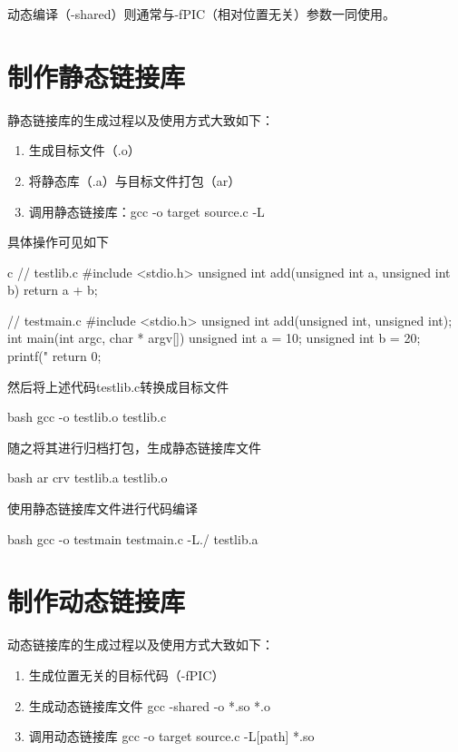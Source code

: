 动态编译（-shared）则通常与-fPIC（相对位置无关）参数一同使用。

\section{制作静态链接库}
静态链接库的生成过程以及使用方式大致如下：
\begin{enumerate}
  \item 生成目标文件（.o）
  \item 将静态库（.a）与目标文件打包（ar）
  \item 调用静态链接库：gcc -o target source.c -L
\end{enumerate}

具体操作可见如下

\begin{code-block}{c}
// testlib.c
#include <stdio.h>
unsigned int add(unsigned int a, unsigned int b)
{
        return a + b;
}

// testmain.c
#include <stdio.h>
unsigned int add(unsigned int, unsigned int);
int main(int argc, char * argv[])
{
        unsigned int a = 10;
        unsigned int b = 20;
        printf("%
        return 0;
}
\end{code-block}

然后将上述代码testlib.c转换成目标文件
\begin{code-block}{bash}
gcc -o testlib.o testlib.c
\end{code-block}

随之将其进行归档打包，生成静态链接库文件
\begin{code-block}{bash}
ar crv testlib.a testlib.o
\end{code-block}

使用静态链接库文件进行代码编译
\begin{code-block}{bash}
gcc -o testmain testmain.c -L./ testlib.a
\end{code-block}

\section{制作动态链接库}
动态链接库的生成过程以及使用方式大致如下：
\begin{enumerate}
  \item 生成位置无关的目标代码（-fPIC）
  \item 生成动态链接库文件 gcc -shared -o *.so *.o
  \item 调用动态链接库 gcc -o target source.c -L[path] *.so
\end{enumerate}

